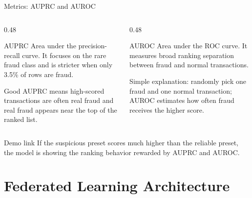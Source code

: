 \documentclass[aspectratio=169,10pt]{beamer}
\begin{document}
\begin{frame}{Metrics: AUPRC and AUROC}
  \begin{columns}[T]
    \begin{column}{0.48\textwidth}
      \begin{block}{AUPRC}
        Area under the precision-recall curve. It focuses on the rare fraud class and is stricter when only 3.5\% of rows are fraud.
      \end{block}
      \small
      Good AUPRC means high-scored transactions are often real fraud and real fraud appears near the top of the ranked list.
    \end{column}
    \begin{column}{0.48\textwidth}
      \begin{block}{AUROC}
        Area under the ROC curve. It measures broad ranking separation between fraud and normal transactions.
      \end{block}
      \small
      Simple explanation: randomly pick one fraud and one normal transaction; AUROC estimates how often fraud receives the higher score.
    \end{column}
  \end{columns}
  \vspace{0.25cm}
  \begin{block}{Demo link}
    If the suspicious preset scores much higher than the reliable preset, the model is showing the ranking behavior rewarded by AUPRC and AUROC.
  \end{block}
\end{frame}

\section{Federated Learning Architecture}
\end{document}
